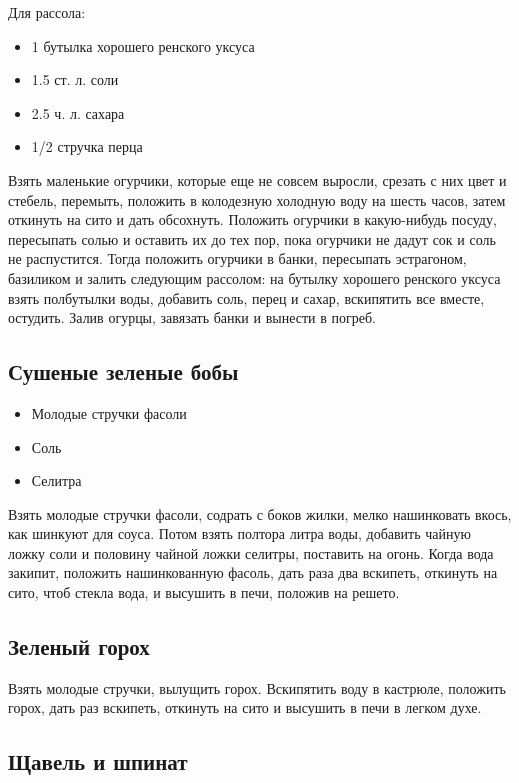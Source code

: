 Для рассола: 
    
\begin{itemize}
	\item 1 бутылка хорошего ренского уксуса 
    \item 1.5 ст. л. соли 
    \item 2.5 ч. л. сахара
    \item 1/2 стручка перца
\end{itemize}

Взять маленькие огурчики, которые еще не совсем выросли, срезать с них цвет и стебель, перемыть, положить в колодезную холодную воду на шесть часов, затем откинуть на сито и дать обсохнуть. Положить огурчики в какую-нибудь посуду, пересыпать солью и оставить их до тех пор, пока огурчики не дадут сок и соль не распустится. Тогда положить огурчики в банки, пересыпать эстрагоном, базиликом и залить следующим рассолом: на бутылку хорошего ренского уксуса взять полбутылки воды, добавить соль, перец и сахар, вскипятить все вместе, остудить. Залив огурцы, завязать банки и вынести в погреб.

\subsection{Сушеные зеленые бобы}

\begin{itemize}
	\item Молодые стручки фасоли
    \item Соль
    \item Селитра
\end{itemize}

Взять молодые стручки фасоли, содрать с боков жилки, мелко нашинковать вкось, как шинкуют для соуса. Потом взять полтора литра воды, добавить чайную ложку соли и половину чайной ложки селитры, поставить на огонь. Когда вода закипит, положить нашинкованную фасоль, дать раза два вскипеть, откинуть на сито, чтоб стекла вода, и высушить в печи, положив на решето.

\subsection{Зеленый горох}

Взять молодые стручки, вылущить горох. Вскипятить воду в кастрюле, положить горох, дать раз вскипеть, откинуть на сито и высушить в печи в легком духе.

\subsection{Щавель и шпинат}

